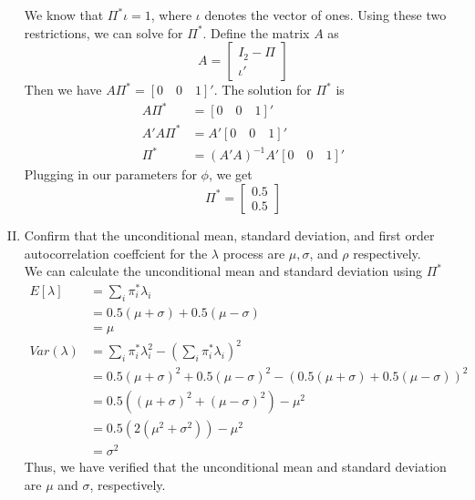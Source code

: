 \documentclass[french]{article}
\begin{document}
\begin{enumerate}[I.]
	We know that $\Pi^*\iota = 1$, where $\iota$ denotes the vector of ones. Using these two restrictions, we can solve for $\Pi^*$. Define the matrix $A$ as 
	\begin{equation*}
		A = \begin{bmatrix}
		I_2 - \Pi \\ \iota'
		\end{bmatrix}
	\end{equation*}
	Then we have $A\Pi^* = \left[0\quad0\quad 1\right]'$. The solution for $\Pi^*$ is 
	\begin{equation*}
	\begin{split}
	A\Pi^* &= \left[0\quad0\quad 1\right]'\\
	A'A\Pi^* &= A'\left[0\quad0\quad 1\right]'\\
	\Pi^* &= (A'A)^{-1}A'\left[0 \quad 0 \quad 1\right]'
	\end{split}
	\end{equation*}
	Plugging in our parameters for $\phi$, we get 
	\begin{equation*}
		\Pi^* =	
		\begin{bmatrix}
		0.5\\ 0.5
		\end{bmatrix}
	\end{equation*}
	\item Confirm that the unconditional mean, standard deviation, and first order autocorrelation coeffcient for the $\lambda$ process are $\mu, \sigma$, and $\rho$ respectively. \\
	
	We can calculate the unconditional mean and standard deviation using $\Pi^*$
	\begin{equation*}
		\begin{split}
		E\left[\lambda\right] &= \sum_i \pi_{i}^*\lambda_i\\
		&= 0.5 (\mu+\sigma) + 0.5(\mu -\sigma)\\
		&= \mu\\
		Var(\lambda)&= \sum_i \pi_{i}^* \lambda_i^2 - \left(\sum_i \pi_{i}^*\lambda_i\right)^2\\
		&=0.5 (\mu+\sigma)^2 + 0.5(\mu -\sigma)^2 - (0.5 (\mu+\sigma) + 0.5(\mu -\sigma))^2\\
		&= 0.5( (\mu+\sigma)^2 +(\mu -\sigma)^2) - \mu^2\\
		&=  0.5( 2(\mu^2+\sigma^2)) - \mu^2\\
		& = \sigma^2
		\end{split}
	\end{equation*}
	Thus, we have verified that the unconditional mean and standard deviation are $\mu$ and $\sigma$, respectively. 
\end{enumerate}
 
\end{document}
